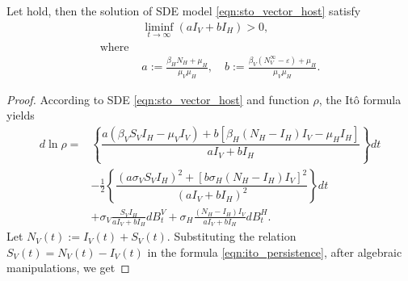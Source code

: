 \begin{theorem}
    Let  hold, then the solution of SDE model
    \eqref{eqn:sto_vector_host} satisfy
    \begin{align*}
        &\liminf_{t \to \infty}
            (a I_V + b I_H) > 0, \\
            \text{where }&
            \\
            & a:= \frac{\beta_H N_H + \mu_H}{\mu_V \mu_H},
            \quad
            b:=
            \frac{
                \beta_V (N_V ^ {\infty} - \varepsilon)
                + \mu_H
                }{\mu_V \mu_H}.
    \end{align*}
\end{theorem}
%
\begin{proof}
    According to SDE \eqref{eqn:sto_vector_host} and function $\rho$,
    the It\^{o} formula yields
    \begin{equation} \label{eqn:ito_persistence} 
        \begin{aligned}
          d \ln \rho =&
            \left \{
                \dfrac{
                    a (\beta_V S_V I_H - \mu_V I_V)
                    +
                    b [\beta_H (N_H - I_H) I_V - \mu_H I_H]
                }{a I_V + bI_H}
            \right \} dt
            \\
            & -
            \frac{1}{2}
            \left \{
                \dfrac{
                    \left(
                        a \sigma_V S_V I_H
                    \right) ^ 2
                    +
                    \left[
                        b \sigma_H (N_H - I_H) I_V
                    \right] ^2
                }{
                    \left( 
                        a I_V + bI_H
                    \right) ^ 2
                }
            \right \} dt
            \\
            & +
            \sigma_V 
            \frac{S_V I_H}{a I_V + b I_H}
            d B_t ^ V
            +
            \sigma_H 
            \frac{(N_H - I_H) I_V}{a I_V + b I_H}
            d B_t ^ H .
        \end{aligned}
    \end{equation}
    Let $N_V(t):= I_V(t) + S_V(t)$. Substituting the relation
    $S_V(t)= N_V(t) - I_V(t)$ in the formula \eqref{eqn:ito_persistence}, %
    after algebraic manipulations, we get

\end{proof}

